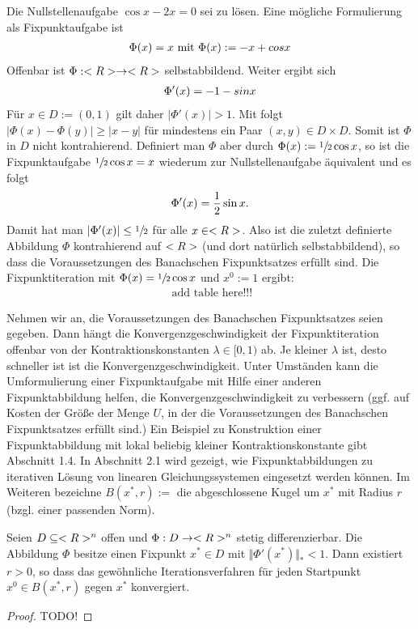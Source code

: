 \begin{example}
	Die Nullstellenaufgabe $\cos x - 2x = 0$ sei zu lösen. Eine mögliche Formulierung als Fixpunktaufgabe ist
	\begin{align}
	\Phi(x) = x \text{   mit  } \Phi(x) := -x + cos x \notag
	\end{align}
	Offenbar ist $\Phi: <R> \to <R>$ selbstabbildend. Weiter ergibt sich
	\begin{align}
	\Phi'(x) = -1 - sin x \notag
	\end{align}
	Für $x \in D := (0,1)$ gilt daher $\vert \Phi' (x)\vert > 1$. Mit  folgt $\vert \Phi(x) - \Phi(y)\vert \ge \vert x-y\vert$ für mindestens ein Paar $(x,y) \in D \times D$. Somit ist $\Phi$ in $D$ nicht kontrahierend.
	Definiert man $\Phi$ aber durch $\Phi(x) := \sfrac{1}{2}\cos x$, so ist die Fixpunktaufgabe $\sfrac{1}{2}\cos x = x$ wiederum zur Nullstellenaufgabe äquivalent und es folgt
	\begin{align}
	\Phi'(x) = \frac{1}{2}\sin x. \notag
	\end{align} 
	Damit hat man $\vert \Phi'(x)\vert \le \sfrac{1}{2}$ für alle $x \in <R>$. Also ist die zuletzt definierte Abbildung $\Phi$ kontrahierend auf $<R>$ (und dort natürlich selbstabbildend), so dass die Voraussetzungen des Banachschen Fixpunktsatzes erfüllt sind. Die Fixpunktiteration mit $\Phi(x) = \sfrac{1}{2}\cos x$ und $x^0 := 1$ ergibt:
	\begin{align}
	\text{ add table here!!!}
	\end{align}
\end{example}

Nehmen wir an, die Voraussetzungen des Banachschen Fixpunktsatzes seien gegeben. Dann hängt die Konvergenzgeschwindigkeit der Fixpunktiteration offenbar von der Kontraktionskonstanten $\lambda \in [0,1)$ ab. Je kleiner $\lambda$ ist, desto schneller ist ist die Konvergenzgeschwindigkeit. Unter Umständen kann die Umformulierung einer Fixpunktaufgabe mit Hilfe einer anderen Fixpunktabbildung helfen, die Konvergenzgeschwindigkeit zu verbessern (ggf. auf Kosten der Größe der Menge $U$, in der die Voraussetzungen des Banachschen Fixpunktsatzes erfüllt sind.) Ein Beispiel zu Konstruktion einer Fixpunktabbildung mit lokal beliebig kleiner Kontraktionskonstante gibt Abschnitt 1.4. In Abschnitt 2.1 wird gezeigt, wie Fixpunktabbildungen zu iterativen Lösung von linearen Gleichungssystemen eingesetzt werden können.
Im Weiteren bezeichne $B(x^{\ast}, r) :=$ die abgeschlossene Kugel um $x^{\ast}$ mit Radius $r$ (bzgl. einer passenden Norm).

\begin{proposition}[Ostrowski]
	Seien $D \subseteq <R>^n$ offen und $\Phi: D \to <R>^n$ stetig differenzierbar. Die Abbildung $\Phi$ besitze einen Fixpunkt $x^{\ast} \in D$ mit $\Vert \Phi'(x^{\ast})\Vert_{\ast} < 1$. Dann existiert $r > 0$, so dass das gewöhnliche Iterationsverfahren für jeden Startpunkt $x^0 \in B(x^{\ast}, r)$ gegen $x^{\ast}$ konvergiert.
\end{proposition}

\begin{proof}
	TODO!
\end{proof}